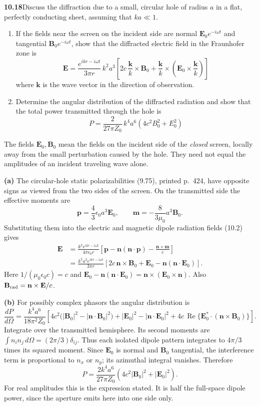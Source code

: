 \par\bigskip
\noindent\textbf{10.18}\quad Discuss the diffraction due to a small, circular hole of radius $a$ in a flat, perfectly conducting sheet, assuming that $ka\ll1$.
\begin{enumerate}
\item[(a)] If the fields near the screen on the incident side are normal $\mathbf{E}_{0}e^{-i\omega t}$ and tangential $\mathbf{B}_{0}e^{-i\omega t}$, show that the diffracted electric field in the Fraunhofer zone is
\[
\mathbf{E}=\frac{e^{ikr-i\omega t}}{3\pi r}\,k^{2}a^{3}\!\left[2c\,\frac{\mathbf{k}}{k}\times\mathbf{B}_{0}+\frac{\mathbf{k}}{k}\times\!\left(\mathbf{E}_{0}\times\frac{\mathbf{k}}{k}\right)\right]
\]
where $\mathbf{k}$ is the wave vector in the direction of observation.
\item[(b)] Determine the angular distribution of the diffracted radiation and show that the total power transmitted through the hole is
\[
P=\frac{2}{27\pi Z_{0}}\,k^{4}a^{6}(4c^{2}B_{0}^{2}+E_{0}^{2})
\]
\end{enumerate}
\solution
The fields $\mathbf E_0,\mathbf B_0$ mean the fields on the incident
side of the \emph{closed} screen, locally away from the small perturbation
caused by the hole. They need not equal the amplitudes of an incident
traveling wave alone.

\textbf{(a)} The circular-hole static polarizabilities (9.75), printed
p.~424, have opposite signs as viewed from the two sides of the screen.
On the transmitted side the effective moments are
\[
\mathbf p=\frac43\epsilon_0a^3\mathbf E_0,\qquad
\mathbf m=-\frac8{3\mu_0}a^3\mathbf B_0 .
\]
Substituting them into the electric and magnetic dipole radiation fields
(10.2) gives
\[
\begin{split}
\mathbf E&=\frac{k^2e^{ikr-i\omega t}}{4\pi\epsilon_0r}
\left[\mathbf p-\mathbf n(\mathbf n\cdot\mathbf p)
-\frac{\mathbf n\times\mathbf m}{c}\right]\\
&=\boxed{\frac{k^2a^3e^{ikr-i\omega t}}{3\pi r}
[2c\,\mathbf n\times\mathbf B_0+
\mathbf E_0-\mathbf n(\mathbf n\cdot\mathbf E_0)]}.
\end{split}
\]
Here $1/(\mu_0\epsilon_0c)=c$ and
$\mathbf E_0-\mathbf n(\mathbf n\cdot\mathbf E_0)
=\mathbf n\times(\mathbf E_0\times\mathbf n)$.
Also $\mathbf B_{\rm rad}=\mathbf n\times\mathbf E/c$.

\textbf{(b)} For possibly complex phasors the angular distribution is
\[
\boxed{\frac{dP}{d\Omega}=\frac{k^4a^6}{18\pi^2Z_0}
\left[4c^2\bigl(|\mathbf B_0|^2-|\mathbf n\cdot\mathbf B_0|^2\bigr)
+|\mathbf E_0|^2-|\mathbf n\cdot\mathbf E_0|^2
+4c\,\operatorname{Re}\{\mathbf E_0^*\cdot
(\mathbf n\times\mathbf B_0)\}\right].}
\]
Integrate over the transmitted hemisphere. Its second moments are
$\int n_in_j\,d\Omega=(2\pi/3)\delta_{ij}$.
Thus each isolated dipole pattern integrates to $4\pi/3$ times its
squared moment. Since $\mathbf E_0$ is normal and $\mathbf B_0$
tangential, the interference term is proportional to $n_x$ or $n_y$;
its azimuthal integral vanishes. Therefore
\[
\boxed{P=\frac{2k^4a^6}{27\pi Z_0}
(4c^2|\mathbf B_0|^2+|\mathbf E_0|^2).}
\]
For real amplitudes this is the expression stated. It is half the
full-space dipole power, since the aperture emits here into one side only.

